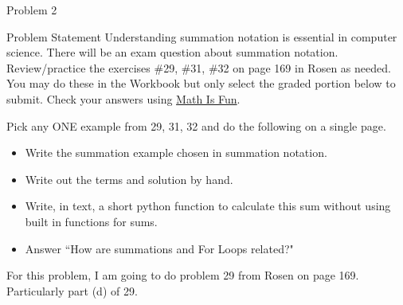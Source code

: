 \begin{problem}{Problem 2}
    \begin{statement}{Problem Statement}
        Understanding summation notation is essential in computer science. There will be an exam question about summation notation. Review/practice the exercises \#29, \#31, \#32 on page 169 in Rosen 
        as needed. You may do these in the Workbook but only select the graded portion below to submit. Check your answers using \href{https://www.mathsisfun.com/numbers/sigma-calculator.html}{Math Is Fun}. \vspace*{1em}

        Pick any ONE example from 29, 31, 32 and do the following on a single page.

        \begin{itemize}
            \item Write the summation example chosen in summation notation.
            \item Write out the terms and solution by hand.
            \item Write, in text, a short python function to calculate this sum without using built in functions for sums.
            \item Answer “How are summations and For Loops related?"
        \end{itemize}
    \end{statement}

    \begin{highlight}[Solution - \#29]
        For this problem, I am going to do problem 29 from Rosen on page 169. Particularly part (d) of 29.


\end{highlight}
\end{problem}
